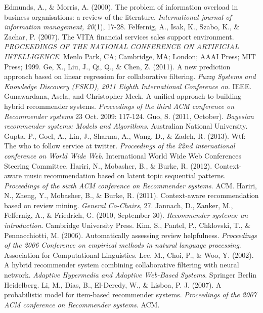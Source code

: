 \documentclass[12pt]{article}
\begin{document}
\begin{thebibliography}{100}
 Edmunds, A., \& Morris, A. (2000). The problem of information overload in business organisations: a review of the literature. \textit{International journal of information management, 20}(1), 17-28.
 Felfernig, A., Isak, K., Szabo, K., \& Zachar, P. (2007). The VITA financial services sales support environment. \textit{PROCEEDINGS OF THE NATIONAL CONFERENCE ON ARTIFICIAL INTELLIGENCE}. Menlo Park, CA; Cambridge, MA; London; AAAI Press; MIT Press; 1999.
 Ge, X., Liu, J., Qi, Q., \& Chen, Z. (2011). A new prediction approach based on linear regression for collaborative filtering. \textit{Fuzzy Systems and Knowledge Discovery (FSKD), 2011 Eighth International Conference on}. IEEE.
 Gunawardana, Asela, and Christopher Meek. A unified approach to building hybrid recommender systems. \textit{Proceedings of the third ACM conference on Recommender systems} 23 Oct. 2009: 117-124.
 Guo, S. (2011, October). \textit{Bayesian recommender systems: Models and Algorithms}. Australian National University.
 Gupta, P., Goel, A., Lin, J., Sharma, A., Wang, D., \& Zadeh, R. (2013). Wtf: The who to follow service at twitter. \textit{Proceedings of the 22nd international conference on World Wide Web}. International World Wide Web Conferences Steering Committee.
 Hariri, N., Mobasher, B., \& Burke, R. (2012). Context-aware music recommendation based on latent topic sequential patterns. \textit{Proceedings of the sixth ACM conference on Recommender systems}. ACM.
 Hariri, N., Zheng, Y., Mobasher, B., \& Burke, R. (2011). Context-aware recommendation based on review mining. \textit{General Co-Chairs}, 27.
 Jannach, D., Zanker, M., Felfernig, A., \& Friedrich, G. (2010, September 30). \textit{Recommender systems: an introduction}. Cambridge University Press.
 Kim, S., Pantel, P., Chklovski, T., \& Pennacchiotti, M. (2006). Automatically assessing review helpfulness. \textit{Proceedings of the 2006 Conference on empirical methods in natural language processing}. Association for Computational Linguistics.
 Lee, M., Choi, P., \& Woo, Y. (2002). A hybrid recommender system combining collaborative filtering with neural network. \textit{Adaptive Hypermedia and Adaptive Web-Based Systems}. Springer Berlin Heidelberg.
 Li, M., Dias, B., El-Deredy, W., \& Lisboa, P. J. (2007). A probabilistic model for item-based recommender systems. \textit{Proceedings of the 2007 ACM conference on Recommender systems}. ACM.

\end{thebibliography}
\end{document}
